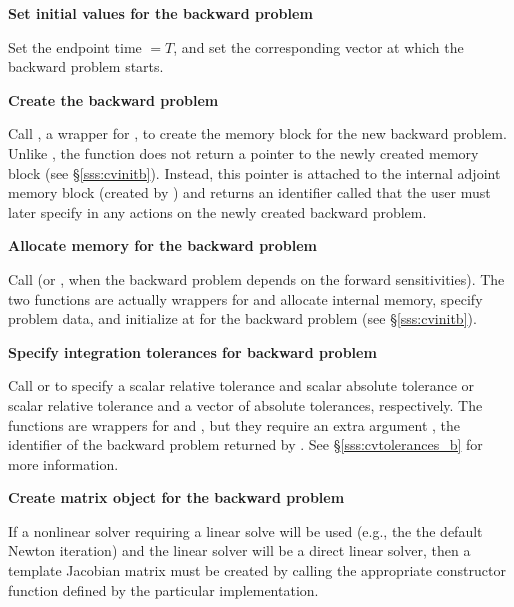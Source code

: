 \begin{Steps}
\item
  {\bf Set initial values for the backward problem}

  Set the endpoint time  $= T$, and set the corresponding vector 
  at which the backward problem starts.

\item
  {\bf Create the backward problem}

  Call , a wrapper for , to
  create the {\cvodes} memory block for the new backward problem. Unlike
  , the function  does not return a pointer to
  the newly created memory block (see \S\ref{sss:cvinitb}). Instead, this pointer
  is attached to the internal adjoint memory  block (created by )
  and returns an identifier called  that the user must later specify
  in any actions on the newly created backward problem.

\item
  {\bf Allocate memory for the backward problem}

  Call  (or , when the backward problem depends on the
  forward sensitivities). The two functions are actually wrappers for 
  and allocate internal memory, specify problem data, and initialize {\cvodes}
  at  for the backward problem (see \S\ref{sss:cvinitb}).

\item
  {\bf Specify integration tolerances for backward problem}

  Call  or 
  to specify a scalar relative tolerance and scalar absolute tolerance or
  scalar relative tolerance and a vector of absolute tolerances, respectively.
  The functions are wrappers for  and
  , but they require an extra argument ,
  the identifier of the backward problem returned by .
  See \S\ref{sss:cvtolerances_b} for more information.


\item \label{i:matrixB}
  {\bf Create matrix object for the backward problem}

  If a nonlinear solver requiring a linear solve will be used (e.g., the
  the default Newton iteration) and the linear solver will be a direct linear
  solver, then a template Jacobian matrix must be created by calling the
  appropriate constructor function defined by the particular {\sunmatrix}
  implementation.


\end{Steps}
